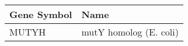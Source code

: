 \begin{tabular}{ll}
\toprule
Gene Symbol &                   Name \\
\midrule
      MUTYH & mutY homolog (E. coli) \\
\bottomrule
\end{tabular}
